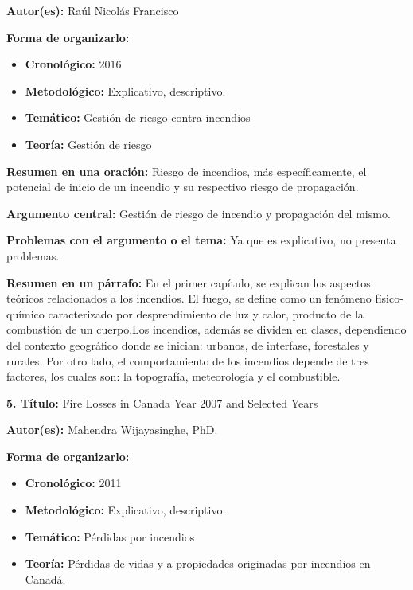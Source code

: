 \documentclass[
  oneside]{memoir}
\begin{document}
\textbf{Autor(es):} Raúl Nicolás Francisco

\textbf{Forma de organizarlo:}

\begin{itemize}

\item \textbf{Cronológico:} 2016 

\item \textbf{Metodológico:} Explicativo, descriptivo.

\item \textbf{Temático:} Gestión de riesgo contra incendios

\item \textbf{Teoría:} Gestión de riesgo
\end{itemize}

\textbf{Resumen en una oración:} Riesgo de incendios, más
específicamente, el potencial de inicio de un incendio y su respectivo
riesgo de propagación.

\textbf{Argumento central:} Gestión de riesgo de incendio y propagación
del mismo.

\textbf{Problemas con el argumento o el tema:} Ya que es explicativo, no
presenta problemas.

\textbf{Resumen en un párrafo:} En el primer capítulo, se explican los
aspectos teóricos relacionados a los incendios. El fuego, se define como
un fenómeno físico-químico caracterizado por desprendimiento de luz y
calor, producto de la combustión de un cuerpo.Los incendios, además se
dividen en clases, dependiendo del contexto geográfico donde se inician:
urbanos, de interfase, forestales y rurales. Por otro lado, el
comportamiento de los incendios depende de tres factores, los cuales
son: la topografía, meteorología y el combustible.

\textbf{ 5. Título:} Fire Losses in Canada Year 2007 and Selected Years

\textbf{Autor(es):} Mahendra Wijayasinghe, PhD.

\textbf{Forma de organizarlo:}

\begin{itemize}

\item \textbf{Cronológico:} 2011

\item \textbf{Metodológico:} Explicativo, descriptivo.

\item \textbf{Temático:} Pérdidas por incendios

\item \textbf{Teoría:} Pérdidas de vidas y a propiedades originadas por incendios en Canadá.
\end{itemize}
\end{document}
